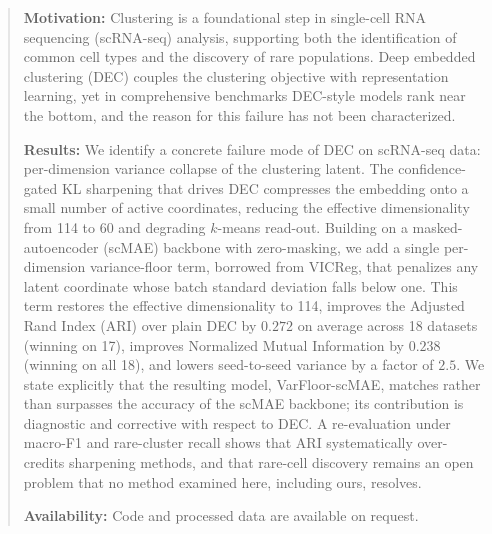 \begin{abstract}
\noindent\textbf{Motivation:} Clustering is a foundational step in single-cell RNA
sequencing (scRNA-seq) analysis, supporting both the identification of common cell
types and the discovery of rare populations. Deep embedded clustering (DEC) couples
the clustering objective with representation learning, yet in comprehensive benchmarks
DEC-style models rank near the bottom, and the reason for this failure has not been
characterized.

\noindent\textbf{Results:} We identify a concrete failure mode of DEC on scRNA-seq
data: per-dimension variance collapse of the clustering latent. The confidence-gated
KL sharpening that drives DEC compresses the embedding onto a small number of active
coordinates, reducing the effective dimensionality from 114 to 60 and degrading
$k$-means read-out. Building on a masked-autoencoder (scMAE) backbone with zero-masking,
we add a single per-dimension variance-floor term, borrowed from VICReg, that penalizes
any latent coordinate whose batch standard deviation falls below one. This term restores
the effective dimensionality to 114, improves the Adjusted Rand Index (ARI) over plain
DEC by $0.272$ on average across 18 datasets (winning on 17), improves Normalized Mutual
Information by $0.238$ (winning on all 18), and lowers seed-to-seed variance by a factor
of $2.5$. We state explicitly that the resulting model, VarFloor-scMAE, matches rather
than surpasses the accuracy of the scMAE backbone; its contribution is diagnostic and
corrective with respect to DEC. A re-evaluation under macro-F1 and rare-cluster recall
shows that ARI systematically over-credits sharpening methods, and that rare-cell
discovery remains an open problem that no method examined here, including ours, resolves.

\noindent\textbf{Availability:} Code and processed data are available on request.
\end{abstract}
